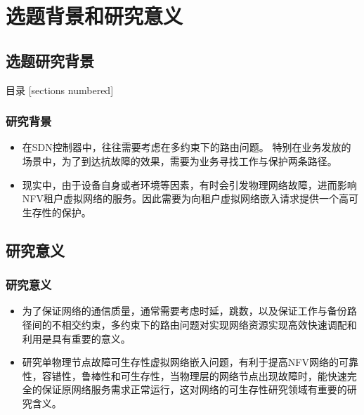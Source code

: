 \section{选题背景和研究意义}
\subsection{选题研究背景}



\begin{frame}{目录}
    [sections numbered]
\end{frame}
\addtocounter{framenumber}{-1}  %

\begin{frame}
\frametitle{研究背景}
\begin{itemize}
  \item 在SDN控制器中，往往需要考虑在多约束下的路由问题。 特别在业务发放的场景中，为了到达抗故障的效果，需要为业务寻找工作与保护两条路径。
  \item 现实中，由于设备自身或者环境等因素，有时会引发物理网络故障，进而影响NFV租户虚拟网络的服务。因此需要为向租户虚拟网络嵌入请求提供一个高可生存性的保护。
\end{itemize}
\end{frame}

\subsection{研究意义}
\begin{frame}
\frametitle{研究意义}
\begin{itemize}
  \item 为了保证网络的通信质量，通常需要考虑时延，跳数，以及保证工作与备份路径间的不相交约束，多约束下的路由问题对实现网络资源实现高效快速调配和利用是具有重要的意义。
  \item 研究单物理节点故障可生存性虚拟网络嵌入问题，有利于提高NFV网络的可靠性，容错性，鲁棒性和可生存性，当物理层的网络节点出现故障时，能快速完全的保证原网络服务需求正常运行，这对网络的可生存性研究领域有重要的研究含义。
\end{itemize}
\end{frame}


